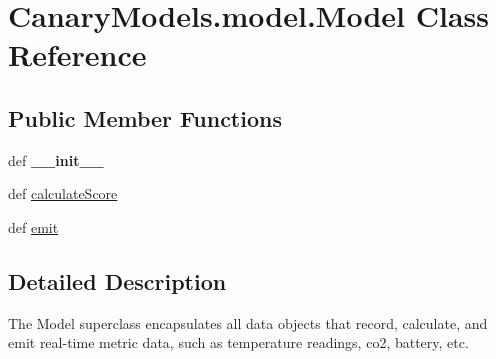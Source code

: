 \hypertarget{class_canary_models_1_1model_1_1_model}{\section{Canary\-Models.\-model.\-Model Class Reference}
\label{class_canary_models_1_1model_1_1_model}
}
\subsection*{Public Member Functions}
\begin{DoxyCompactItemize}
\item 
\hypertarget{class_canary_models_1_1model_1_1_model_a6195956c3d4d7723bfc5d7c84f5414f5}{def {\bfseries \-\_\-\-\_\-init\-\_\-\-\_\-}}\label{class_canary_models_1_1model_1_1_model_a6195956c3d4d7723bfc5d7c84f5414f5}

\item 
def \hyperlink{class_canary_models_1_1model_1_1_model_ae870c9ec745dcaffd0f2e3079ac5f858}{calculate\-Score}
\item 
def \hyperlink{class_canary_models_1_1model_1_1_model_ac29ca0daac365076bc0c5d183d665354}{emit}
\end{DoxyCompactItemize}


\subsection{Detailed Description}
\begin{DoxyVerb}The Model superclass encapsulates all data objects that record, calculate, and emit real-time metric data, such as temperature readings, co2, battery, etc.\end{DoxyVerb}
 

